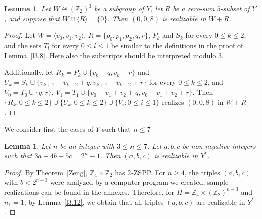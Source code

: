 \documentclass[final]{dmtcs-episciences}
\newcommand{\comK}[1]{{\color{blue} (Komentarz: #1)}}
\newtheorem{lem}[thm]{Lemma}
\newcommand{\zet}{\mathbb{Z}}
\begin{document}
\begin{lem}\label{l3.9} Let $W\cong(\zet_2)^3$ be a subgroup of $Y$, let $R$ be a zero-sum $5$-subset of $Y$, and suppose that $W\cap\langle R\rangle=\{0\}$. Then $(0,0,8)$ is realizable in $W+R$.\end{lem}
\begin{proof}

Let $ W=\langle v_{0}, v_{1}, v_{2}\rangle$, $R=\{p_{0}, p_{1}, p_{2}, q, r\}$, $P_{k}$ and $S_{k}$ for every $0\leq k \leq 2$, and the sets $T_{l}$ for every  $0\leq l\leq 1$ be similar to the definitions in the proof of Lemma~\ref{l3.8}. Here also the subscripts should be interpreted modulo 3.

 {Additionally, let
$R_{k}=P_{k}\cup\{v_{k}+q, v_{k}+r\}$ and
$U_{k}=S_{k}\cup\{v_{k+1}+v_{k+2}+q,
v_{k+1}+v_{k+2}+r\}$ for every  $0\leq k \leq 2$, and
$V_{0}=T_{0}\cup\{q, r\}$, $V_{1}=T_{1}\cup\{v_{0}+v_{1}+v_{2}+q, v_{0}+v_{1}+v_{2}+r\}$.
Then $\{R_{k} : 0\leq k \leq 2\} \cup \{U_{k} : 0\leq k \leq 2\} \cup \{V_{i} : 0 \leq i \leq 1\}$ realizes $(0,0,8)$ in $W+R$.}
\end{proof}


We consider first the cases of $Y$ such that $n\leq 7$
\begin{lem}\label{z224m} Let $n$ be an integer with $3\leq n\leq 7$. Let $a,b,c$ be non-negative integers such that $3a+4b+5c=2^n-1$. Then $(a,b,c)$ is realizable in $Y^*$. \end{lem}
\begin{proof}
By Theorem~\ref{Zeng}, $\zet_4\times\zet_2$ has $2$-ZSPP. For $n\geq 4$, the triples $(a, b, c)$ with $b<2^{n-3}$ were analyzed by a computer program we created, sample realizations can be found in the annexes. Therefore, for $H =\zet_4\times(\zet_2)^{n-3}$ and  $n_1=1$, by Lemma~\ref{l3.12}, we obtain that all triples $(a,b,c)$ are realizable in $Y^*$.
\end{proof}
\end{document}
